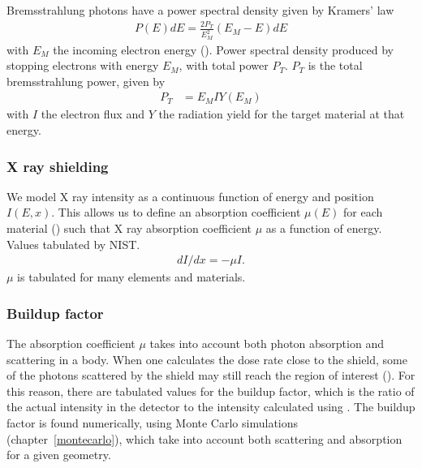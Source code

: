 Bremsstrahlung photons have a power spectral density given by
Kramers' law\cite{kramers_xciii._1923}
\begin{align}
    P(E)dE = \frac{2P_T}{E_M^2}(E_M-E)dE
    \label{eq:kramers}
\end{align} with $E_M$ the incoming electron energy ().
{Power spectral density produced by stopping electrons with energy $E_M$,
with total power $P_T$.}
$P_T$ is the total bremsstrahlung power, given by
\begin{align*}
    P_T&=E_MIY(E_M)
\end{align*} with $I$ the electron flux
and $Y$ the radiation yield for the target material at that energy.
\subsubsection{X ray shielding}
We model X ray intensity as a continuous function of energy and position $I(E,x)$.
This allows us to define an absorption coefficient $\mu(E)$ for each material
() such that
{X ray absorption coefficient $\mu$ as a function of energy.
    Values tabulated by NIST\cite{xraycoef}.}
\begin{align}
    \label{eq:absorcionx}
    dI/dx=-\mu I.
\end{align}
$\mu$ is tabulated for many elements and materials\cite{xraycoef}.
\subsubsection{Buildup factor}
The absorption coefficient $\mu$ takes into account both photon absorption and scattering in a body.
When one calculates the dose rate close to the shield,
some of the photons scattered by the shield may still reach the region of interest
().
For this reason, there are tabulated values for the buildup factor,
which is the ratio of the actual intensity in the detector
to the intensity calculated using .
The buildup factor is found numerically, using Monte Carlo simulations
(chapter~\ref{montecarlo}),
which take into account both scattering and absorption
for a given geometry.
